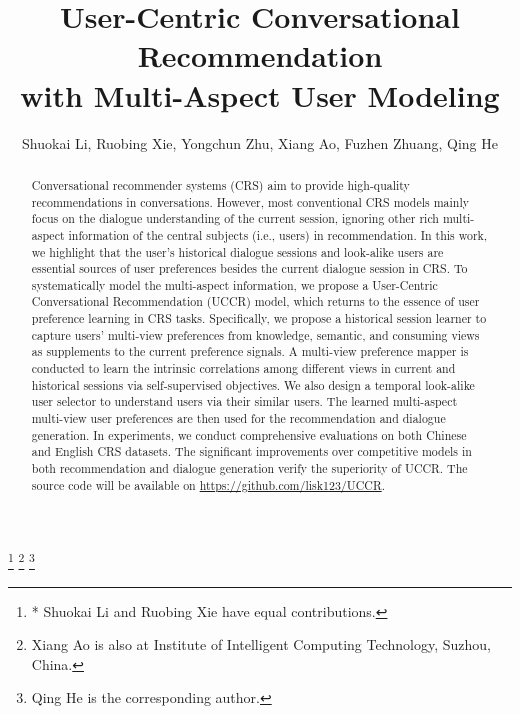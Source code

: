 \documentclass[sigconf,natbib=true]{acmart}
\begin{document}
	
\title[User-Centric Conversational Recommendation with Multi-Aspect User Modeling]{User-Centric Conversational Recommendation\\ with Multi-Aspect User Modeling}

\author{Shuokai Li, Ruobing Xie, Yongchun Zhu, Xiang Ao, Fuzhen Zhuang, Qing He}
\thanks{* Shuokai Li and Ruobing Xie have equal contributions.}
\thanks{ Xiang Ao is also at Institute of Intelligent Computing Technology, Suzhou, China.}
\thanks{ Qing He is the corresponding author.}

\renewcommand{\shortauthors}{S. Li et al.}

\begin{abstract}
Conversational recommender systems (CRS) aim to provide high-quality recommendations in conversations. However, most conventional CRS models mainly focus on the dialogue understanding of the current session, ignoring other rich multi-aspect information of the central subjects (i.e., users) in recommendation. In this work, we highlight that the user's historical dialogue sessions and look-alike users are essential sources of user preferences besides the current dialogue session in CRS. To systematically model the multi-aspect information, we propose a User-Centric Conversational Recommendation (UCCR) model, which returns to the essence of user preference learning in CRS tasks. Specifically, we propose a historical session learner to capture users' multi-view preferences from knowledge, semantic, and consuming views as supplements to the current preference signals. A multi-view preference mapper is conducted to learn the intrinsic correlations among different views in current and historical sessions via self-supervised objectives. We also design a temporal look-alike user selector to understand users via their similar users. The learned multi-aspect multi-view user preferences are then used for the recommendation and dialogue generation. In experiments, we conduct comprehensive evaluations on both Chinese and English CRS datasets. The significant improvements over competitive models in both recommendation and dialogue generation verify the superiority of UCCR. The source code will be available on \href{https://github.com/lisk123/UCCR}{https://github.com/lisk123/UCCR}.
\end{abstract}
\end{document}
